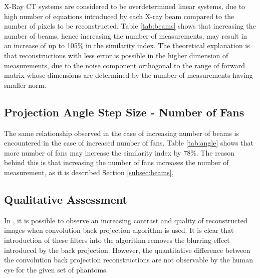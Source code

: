 \documentclass[journal]{IEEEtran}
\begin{document}
X-Ray CT systems are considered to be overdetermined linear systems, due to high number of equations introduced by each X-ray beam compared to the number of pixels to be reconstructed. Table \ref{tab:beams} shows that increasing the number of beams, hence increasing the number of measurements, may result in an increase of up to 105\% in the similarity index. The theoretical explanation is that reconstructions with less error is possible in the higher dimension of measurements, due to the noise component orthogonal to the range of forward matrix whose dimensions are determined by the number of measurements having smaller norm.

\subsection{Projection Angle Step Size - Number of Fans}
The same relationship observed in the case of increasing number of beams is encountered in the case of increased number of fans. Table \ref{tab:angle} shows that more number of fans may increase the similarity index by 78\%. The reason behind this is that increasing the number of fans increases the number of measurement, as it is described Section \ref{subsec:beams}, 

\subsection{Qualitative Assessment}
In , it is possible to observe an increasing contrast and quality of reconstructed images when convolution back projection algorithm is used. It is clear that introduction of these filters into the algorithm removes the blurring effect introduced by the back projection. However, the quantitative difference between the convolution back projection reconstructions are not observable by the human eye for the given set of phantoms.
\newpage
\printbibliography
\end{document}

